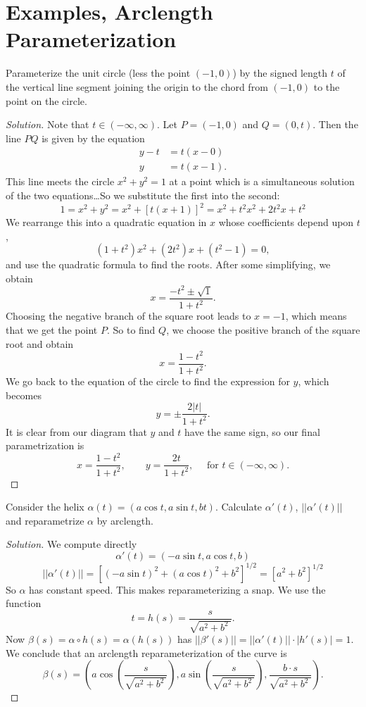 \documentclass[Shifrin_Solutions_Spring_2015]{subfiles}
\begin{document}
\section{Examples, Arclength Parameterization}

\begin{exercise}
Parameterize the unit circle (less the point $(-1,0)$)  by the signed length $t$ of the vertical line segment joining the origin to the chord from $(-1,0)$ to the point on the circle.
\end{exercise}

\begin{proof}[Solution]
Note that $t \in (-\infty, \infty)$. Let $P = (-1,0)$ and $Q = (0,t)$. Then the line $PQ$ is given by the equation
\[
\begin{split}
y-t &= t ( x - 0) \\
 y & = t ( x-1).
\end{split}
\]
This line meets the circle $x^2  + y^2 = 1$ at a point which is a simultaneous solution of the two equations\dots So we substitute the first into the second:
\[
1 = x^2 + y^2 = x^2 + [t(x+1)]^2 = x^2 + t^2x^2 + 2t^2x + t^2
\]
We rearrange this into a quadratic equation in $x$ whose coefficients depend upon $t$,
\[
(1+t^2) x^2 + (2t^2) x + (t^2 - 1) = 0,
\]
and use the quadratic formula to find the roots. After some simplifying, we obtain
\[
x = \dfrac{-t^2 \pm \sqrt{1}}{1+t^2}.
\]
Choosing the negative branch of the square root leads to $x=-1$, which means that we get the point $P$. So to find $Q$, we choose the positive branch of the square root and obtain
\[
x = \dfrac{1-t^2}{1+t^2}.
\]
We go back to the equation of the circle to find the expression for $y$, which becomes
\[
y =\pm \dfrac{ 2|t|}{1+t^2}.
\]
It is clear from our diagram that $y$ and $t$ have the same sign, so our final parametrization is
\[
x = \dfrac{1-t^2}{1+t^2}, \qquad y = \dfrac{ 2t}{1+t^2}, \quad \mbox{ for } t \in (-\infty, \infty) .
\]
\end{proof}

\vfill
\pagebreak


\begin{exercise}
Consider the helix $\alpha(t) = ( a \cos t , a \sin t , b t )$. Calculate $\alpha'(t)$,
$||\alpha'(t)||$ and reparametrize $\alpha$ by arclength.
\end{exercise}

\begin{proof}[Solution] We compute directly
\[
\alpha'(t) = ( - a \sin t, a \cos t , b)
\]
\[
||\alpha'(t)|| = [ (-a\sin t)^2 + (a \cos t)^2 + b^2]^{1/2} = [a^2+b^2]^{1/2}
\]
So $\alpha$ has constant speed. This makes reparameterizing a snap. We use the function
\[
t = h(s) = \dfrac{s}{\sqrt{a^2 + b^2 \ }}.
\]
Now $\beta(s) = \alpha \circ h(s) = \alpha(h(s))$ has $||\beta'(s)|| = ||\alpha'(t)||\cdot |h'(s)| = 1$.
We conclude that an arclength reparameterization of the curve is
\[
\beta(s) = \left( a \cos \left(\dfrac{s}{\sqrt{a^2 + b^2 \ }}\right) , a \sin\left( \dfrac{s}{\sqrt{a^2 + b^2 \ }}\right) , \dfrac{b \cdot s}{\sqrt{a^2 + b^2 \ }} \right).
\]
\end{proof}
\end{document}
